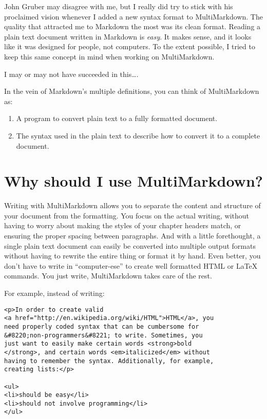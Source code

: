 John Gruber may disagree with me, but I really did try to stick with his proclaimed vision whenever I added a new syntax format to MultiMarkdown. The quality that attracted me to Markdown the most was its clean format. Reading a plain text document written in Markdown is \emph{easy}. It makes sense, and it looks like it was designed for people, not computers. To the extent possible, I tried to keep this same concept in mind when working on MultiMarkdown.

I may or may not have succeeded in this{\ldots}.

In the vein of Markdown's multiple definitions, you can think of MultiMarkdown as:

\begin{enumerate}
\item A program to convert plain text to a fully formatted document.

\item The syntax used in the plain text to describe how to convert it to a complete document.

\end{enumerate}

\section{Why should I use MultiMarkdown? }
\label{whyshouldiusemultimarkdown}

Writing with MultiMarkdown allows you to separate the content and structure of your document from the formatting. You focus on the actual writing, without having to worry about making the styles of your chapter headers match, or ensuring the proper spacing between paragraphs. And with a little forethought, a single plain text document can easily be converted into multiple output formats without having to rewrite the entire thing or format it by hand. Even better, you don't have to write in ``computer-ese'' to create well formatted HTML or LaTeX commands. You just write, MultiMarkdown takes care of the rest.

For example, instead of writing:

\begin{verbatim}
<p>In order to create valid 
<a href="http://en.wikipedia.org/wiki/HTML">HTML</a>, you 
need properly coded syntax that can be cumbersome for 
&#8220;non-programmers&#8221; to write. Sometimes, you
just want to easily make certain words <strong>bold
</strong>, and certain words <em>italicized</em> without
having to remember the syntax. Additionally, for example,
creating lists:</p>

<ul>
<li>should be easy</li>
<li>should not involve programming</li>
</ul>
\end{verbatim}

